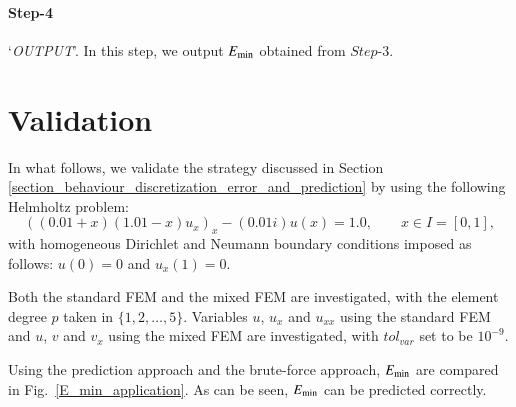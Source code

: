 \documentclass[review,3p]{elsarticle}
\begin{document}
\paragraph{Step-4} `\textit{OUTPUT}'. In this step, we output $E_{\rm min}$ obtained from $Step$-3.

\section{Validation}		\label{section_validation}

In what follows, we validate the strategy discussed in Section \ref{section_behaviour_discretization_error_and_prediction} by using the following Helmholtz problem:
\begin{equation}
  \left((0.01+x)(1.01-x) u_x \right)_x -(0.01i) u(x) = 1.0,\qquad x \in I = [0,1],	\label{1D_Helmholtz_equation_application}
\end{equation}
with homogeneous Dirichlet and Neumann boundary conditions imposed as follows: $u(0)=0$ and $u_x(1)=0$.

Both the standard FEM and the mixed FEM are investigated, with the element degree $p$ taken in $\{1, 2, \ldots, 5\}$. Variables $u$, $u_x$ and $u_{xx}$ using the standard FEM and $u$, $v$ and $v_x$ using the mixed FEM are investigated, with $tol_{var}$ set to be $10^{-9}$. 

Using the prediction approach and the brute-force approach, $E_{\rm min}$ are compared in Fig.~\ref{E_min_application}. As can be seen, $E_{\rm min}$ can be predicted correctly.
\end{document}
